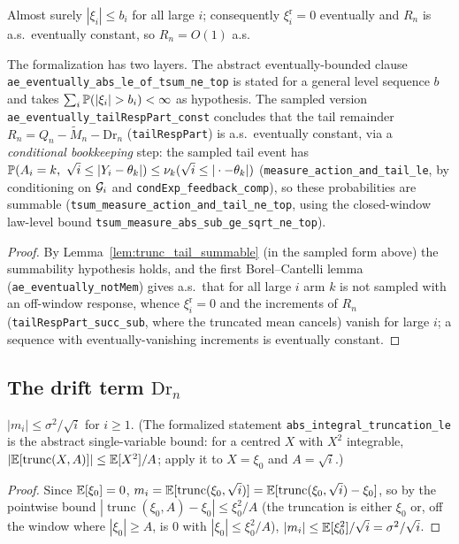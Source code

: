 \begin{lemma}\label{lem:trunc_tail_const}
\leanok
{}
Almost surely $|\xi_i|\le b_i$ for all large $i$; consequently $\xi_i^{\mathrm r}=0$ eventually and
$R_n$ is a.s.\ eventually constant, so $R_n=O(1)$ a.s.

The formalization has two layers. The abstract eventually-bounded clause
\texttt{ae\_eventually\_abs\_le\_of\_tsum\_ne\_top} is stated for a general level sequence $b$ and
takes $\sum_i\Prob(|\xi_i|>b_i)<\infty$ as hypothesis. The sampled version
\texttt{ae\_eventually\_tailRespPart\_const} concludes that the tail remainder
$R_n=Q_n-\tilde M_n-\mathrm{Dr}_n$ (\texttt{tailRespPart}) is a.s.\ eventually constant, via a
\emph{conditional bookkeeping} step: the sampled tail event has
$\mathbb{P}(A_i=k,\ \sqrt i\le|Y_i-\theta_k|)\le\nu_k(\sqrt i\le|\cdot-\theta_k|)$
(\texttt{measure\_action\_and\_tail\_le}, by conditioning on $\mathcal{G}_i$ and
\texttt{condExp\_feedback\_comp}), so these probabilities are summable
(\texttt{tsum\_measure\_action\_and\_tail\_ne\_top}, using the closed-window law-level bound
\texttt{tsum\_measure\_abs\_sub\_ge\_sqrt\_ne\_top}).
\end{lemma}
\begin{proof}\leanok
{}
By Lemma~\ref{lem:trunc_tail_summable} (in the sampled form above) the summability hypothesis holds,
and the first Borel--Cantelli lemma (\texttt{ae\_eventually\_notMem}) gives a.s.\ that for all large
$i$ arm $k$ is not sampled with an off-window response, whence $\xi_i^{\mathrm r}=0$ and the
increments of $R_n$ (\texttt{tailRespPart\_succ\_sub}, where the truncated mean cancels) vanish for
large $i$; a sequence with eventually-vanishing increments is eventually constant.
\end{proof}

\subsection{The drift term $\mathrm{Dr}_n$}

\begin{lemma}\label{lem:trunc_mean_bound}
\leanok
{}
$|m_i|\le \sigma^2/\sqrt i$ for $i\ge1$. (The formalized statement
\texttt{abs\_integral\_truncation\_le} is the abstract single-variable bound: for a centred $X$
with $X^2$ integrable, $|\mathbb{E}[\operatorname{trunc}(X,A)]|\le \mathbb{E}[X^2]/A$; apply it to $X=\xi_0$ and
$A=\sqrt i$.)
\end{lemma}
\begin{proof}\leanok
Since $\mathbb{E}[\xi_0]=0$, $m_i=\mathbb{E}[\operatorname{trunc}(\xi_0,\sqrt i)]
=\mathbb{E}[\operatorname{trunc}(\xi_0,\sqrt i)-\xi_0]$, so by the pointwise bound
$|\operatorname{trunc}(\xi_0,A)-\xi_0|\le\xi_0^2/A$ (the truncation is either $\xi_0$ or, off the
window where $|\xi_0|\ge A$, is $0$ with $|\xi_0|\le\xi_0^2/A$),
$|m_i|\le\mathbb{E}[\xi_0^2]/\sqrt i=\sigma^2/\sqrt i$.
\end{proof}

